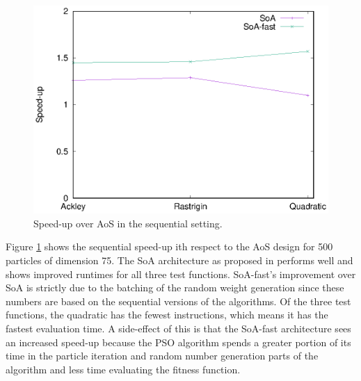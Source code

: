 \begin{figure}
  \includegraphics[width=\columnwidth]{../img/output/speedup_seq}
  \caption{Speed-up over AoS in the sequential setting.}\label{fig:seq-baseline}
\end{figure}

% 
% 

Figure \ref{fig:seq-baseline} shows the sequential speed-up ith respect to the
AoS design for 500 particles of dimension 75. The SoA architecture as proposed
in \cite{cache-pso} performs well and shows improved runtimes for all three test
functions. SoA-fast's improvement over SoA is strictly due to the
batching of the random weight generation since these numbers are based on the
sequential versions of the algorithms. Of the three test functions, the
quadratic has the fewest instructions, which means it has the fastest evaluation
time. A side-effect of this is that the SoA-fast architecture sees an
increased speed-up because the PSO algorithm spends a greater portion of its
time in the particle iteration and random number generation parts of the
algorithm and less time evaluating the fitness function.



